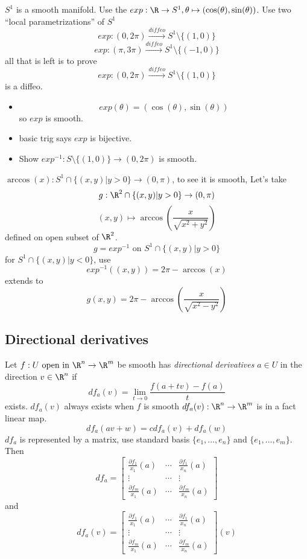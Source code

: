 \begin{example}
  $S^1$ is a smooth manifold.
  \newline
  Use the $exp:\R \to S^1, \theta \mapsto (\cos (\theta ), \sin (\theta))$.
  \newline
  Use two ``local parametrizations'' of $S^1$
    $$exp: (0,2\pi)\xrightarrow{diffeo} S^1\setminus\{(1,0)\}$$
    $$exp: (\pi,3\pi)\xrightarrow{diffeo} S^1\setminus\{(-1,0)\}$$
  all that is left is to prove
    $$exp: (0,2\pi)\xrightarrow{diffeo} S^1\setminus\{(1,0)\}$$ is a diffeo.
  \begin{itemize}
    \item
      $$exp(\theta)=(\cos (\theta ), \sin (\theta))$$
    so $exp$ is smooth.
    \item
      basic trig says $exp$ is bijective.
    \item
      Show $exp^{-1}:S\setminus\{(1,0)\}\to (0,2\pi)$ is smooth.
  \end{itemize}
  $\arccos(x):S^1\cap \{(x,y)|y>0\} \to (0,\pi)$, to see it is smooth,
    \newline
    Let's take
      $$g:\R^2\cap \{(x,y)|y>0\} \to (0,\pi)$$
        $$(x,y)\mapsto \arccos(\frac{x}{\sqrt{x^2+y^2}})$$
    defined on open subset of $\R^2$.
      $$g=exp^{-1} \text{ on }S^1\cap \{(x,y)|y>0\}$$
      for $S^1\cap \{(x,y)| y<0\}$, use
        $$exp^{-1}((x,y))=2\pi-\arccos(x)$$
      extends to
        $$g(x,y)=2\pi-\arccos(\frac{x}{\sqrt{x^2-y^2}})$$
\end{example}

\subsection*{Directional derivatives}
Let $f:U \text{ open in }\R^n \to \R^m$ be smooth has \emph{directional derivatives} $a\in U$ in the direction $v\in \R^n$ if
  $$df_a(v)=\lim_{t\to 0}\frac{f(a+tv)-f(a)}{t}$$
exists.
\newline
$df_a(v)$ always exists when $f$ is smooth
\newline
$df_a(v): \R^n\to \R^m$ is in a fact linear map.
  $$df_a(av+w)=cdf_a(v)+df_a(w)$$
$df_a$ is represented by a matrix, use standard basis $\{ e_1,\dots,e_n\}$ and $\{ e_1,\dots , e_m\}$. Then
$$
df_a=
\begin{bmatrix}
  \frac{\partial f_1}{x_1}(a) & \cdots & \frac{\partial f_1}{x_n}(a) \\
  \vdots & \cdots & \vdots \\
  \frac{\partial f_m}{x_1}(a) & \cdots & \frac{\partial f_m}{x_n}(a)
\end{bmatrix}
$$
and
$$
df_a(v)=
\begin{bmatrix}
  \frac{\partial f_1}{x_1}(a) & \cdots & \frac{\partial f_1}{x_n}(a) \\
  \vdots & \cdots & \vdots \\
  \frac{\partial f_m}{x_1}(a) & \cdots & \frac{\partial f_m}{x_n}(a)
\end{bmatrix}
(v)
$$

